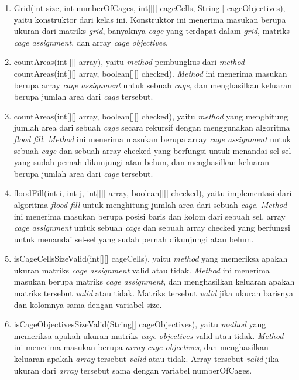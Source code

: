 \begin{enumerate}
\item Grid(int size, int numberOfCages, int[][] cageCells, String[] cageObjectives), yaitu konstruktor dari kelas ini. Konstruktor ini menerima masukan berupa ukuran dari matriks \textit{grid}, banyaknya \textit{cage} yang terdapat dalam \textit{grid}, matriks \textit{cage assignment}, dan array \textit{cage objectives}.
\item countAreas(int[][] array), yaitu \textit{method} pembungkus dari \textit{method} countAreas(int[][] array, boolean[][] checked). \textit{Method} ini menerima masukan berupa array \textit{cage assignment} untuk sebuah \textit{cage}, dan menghasilkan keluaran berupa jumlah area dari \textit{cage} tersebut.
\item countAreas(int[][] array, boolean[][] checked), yaitu \textit{method} yang menghitung jumlah area dari sebuah \textit{cage} secara rekursif dengan menggunakan algoritma \textit{flood fill}. \textit{Method} ini menerima masukan berupa array \textit{cage assignment} untuk sebuah \textit{cage} dan sebuah array checked yang berfungsi untuk menandai sel-sel yang sudah pernah dikunjungi atau belum, dan menghasilkan keluaran berupa jumlah area dari \textit{cage} tersebut.
\item floodFill(int i, int j, int[][] array, boolean[][] checked), yaitu implementasi dari algoritma \textit{flood fill} untuk menghitung jumlah area dari sebuah \textit{cage}. \textit{Method} ini menerima masukan berupa posisi baris dan kolom dari sebuah sel, array \textit{cage assignment} untuk sebuah \textit{cage} dan sebuah array checked yang berfungsi untuk menandai sel-sel yang sudah pernah dikunjungi atau belum.
\item isCageCellsSizeValid(int[][] cageCells), yaitu \textit{method} yang memeriksa apakah ukuran matriks \textit{cage assignment} valid atau tidak. \textit{Method} ini menerima masukan berupa matriks \textit{cage assignment}, dan menghasilkan keluaran apakah matriks tersebut \textit{valid} atau tidak. Matriks tersebut \textit{valid} jika ukuran barisnya dan kolomnya sama dengan variabel size.
\item isCageObjectivesSizeValid(String[] cageObjectives), yaitu \textit{method} yang memeriksa apakah ukuran matriks \textit{cage objectives} valid atau tidak. \textit{Method} ini menerima masukan berupa \textit{array cage objectives}, dan menghasilkan keluaran apakah \textit{array} tersebut \textit{valid} atau tidak. Array tersebut \textit{valid} jika ukuran dari \textit{array} tersebut sama dengan variabel numberOfCages.

\end{enumerate}
